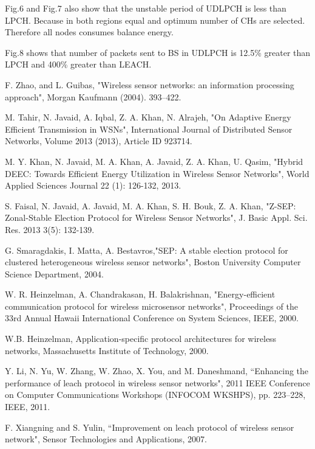 \documentclass[journal]{IEEEtran}
\begin{document}
Fig.6 and Fig.7 also show that the unstable period of UDLPCH is less than LPCH. Because in both regions equal and optimum number of CHs are selected. Therefore all nodes consumes balance energy.

Fig.8 shows that number of packets sent to BS  in UDLPCH is 12.5\% greater than  LPCH and 400\% greater than LEACH.





\begin{thebibliography}{9}
 F. Zhao, and L. Guibas, "Wireless sensor networks: an information processing approach", Morgan Kaufmann (2004).
393–422.

 M. Tahir, N. Javaid, A. Iqbal, Z. A. Khan, N. Alrajeh, "On Adaptive Energy Efficient Transmission in WSNs", International Journal of Distributed Sensor Networks, Volume 2013 (2013), Article ID 923714.

 M. Y. Khan, N. Javaid, M. A. Khan, A. Javaid, Z. A. Khan, U. Qasim, "Hybrid DEEC: Towards Efficient Energy Utilization in Wireless Sensor Networks", World Applied Sciences Journal 22 (1): 126-132, 2013.

 S. Faisal, N. Javaid, A. Javaid, M. A. Khan, S. H. Bouk, Z. A. Khan, "Z-SEP: Zonal-Stable Election Protocol for Wireless Sensor Networks", J. Basic Appl. Sci. Res. 2013 3(5): 132-139.

 G. Smaragdakis, I. Matta, A. Bestavros,"SEP: A stable election protocol for clustered heterogeneous wireless sensor networks", Boston University Computer Science Department, 2004.

 W. R. Heinzelman, A. Chandrakasan, H. Balakrishnan, "Energy-efficient communication protocol for wireless microsensor networks", Proceedings of the 33rd Annual Hawaii International Conference on System Sciences, IEEE, 2000.

 W.B. Heinzelman, Application-specific protocol architectures for wireless networks, Massachusetts Institute of Technology, 2000.

 Y. Li, N. Yu, W. Zhang, W. Zhao, X. You, and M. Daneshmand, “Enhancing the performance of leach protocol in wireless sensor networks", 2011 IEEE Conference on Computer Communications Workshops (INFOCOM WKSHPS), pp. 223–228, IEEE, 2011.

 F. Xiangning and S. Yulin, “Improvement on leach protocol of wireless sensor network", Sensor Technologies and Applications, 2007.


\end{thebibliography}
\end{document}
